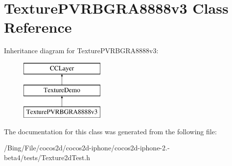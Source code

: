 \hypertarget{interface_texture_p_v_r_b_g_r_a8888v3}{\section{Texture\-P\-V\-R\-B\-G\-R\-A8888v3 Class Reference}
\label{interface_texture_p_v_r_b_g_r_a8888v3}
}
Inheritance diagram for Texture\-P\-V\-R\-B\-G\-R\-A8888v3\-:\begin{figure}[H]
\begin{center}
\leavevmode
\includegraphics[height=3.000000cm]{interface_texture_p_v_r_b_g_r_a8888v3}
\end{center}
\end{figure}


The documentation for this class was generated from the following file\-:\begin{DoxyCompactItemize}
\item 
/\-Bing/\-File/cocos2d/cocos2d-\/iphone/cocos2d-\/iphone-\/2.-\/beta4/tests/Texture2d\-Test.\-h\end{DoxyCompactItemize}
